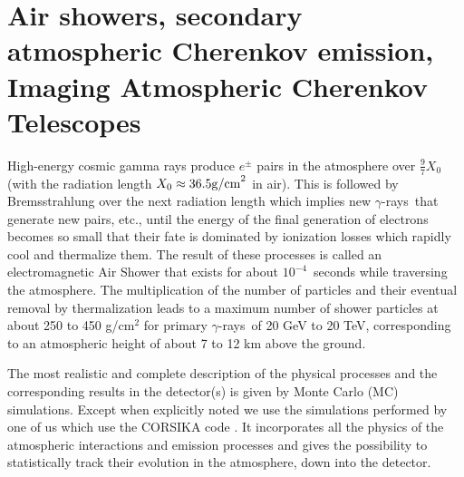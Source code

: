 \documentclass{svjour3x}                     %
\newcommand{\grs}{$\gamma$-rays}
\begin{document}

\section{Air showers, secondary atmospheric Cherenkov emission, Imaging
  Atmospheric Cherenkov Telescopes}
\label{sec:2}

High-energy cosmic gamma rays produce $e^{\pm}$ pairs in the atmosphere over 
$\frac{9}{7}X_0$ (with the radiation length $X_0 \approx 36.5 \rm{g/cm}^2$
in air). This is followed by
Bremsstrahlung over the next radiation length which 
implies new \grs\ that generate new pairs, etc., until
the energy of the final generation of electrons becomes so small that their
fate is dominated by ionization losses which rapidly cool and thermalize
them. The result of these processes is called an electromagnetic Air Shower
that exists for about $10^{-4}$~seconds while traversing the atmosphere. The
multiplication of the number of particles and their eventual removal by
thermalization leads to a maximum number of shower particles at about 250 to
450 g/cm$^{2}$ for primary \grs\ of 20 GeV to 20 TeV, corresponding to an
atmospheric height of about 7 to 12 km above the ground.

The most realistic and complete description of the physical processes and the
corresponding results in the detector(s) is given by Monte Carlo (MC)
simulations. Except when explicitly noted we use the simulations performed by
one of us \cite{bernloehr2008} which use the CORSIKA code \cite{corsika}. It
incorporates all the physics of the atmospheric interactions and emission
processes and gives the possibility to statistically track their evolution in
the atmosphere, down into the detector.
\end{document}
